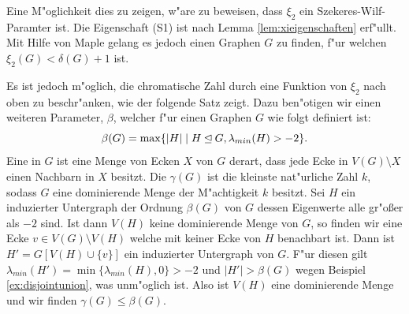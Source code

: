 Eine M"oglichkeit dies zu zeigen, w"are zu beweisen, dass $\xi_2$ ein Szekeres-Wilf-Paramter ist. Die Eigenschaft (S1) ist nach Lemma \ref{lem:xieigenschaften} erf"ullt. Mit Hilfe von Maple gelang es jedoch einen Graphen $G$ zu finden, f"ur welchen $\xi_{2}(G) < \delta(G) + 1$ ist. 

Es ist jedoch m"oglich, die chromatische Zahl durch eine Funktion von $\xi_2$ nach oben zu beschr"anken, wie der folgende Satz zeigt. Dazu ben"otigen wir einen weiteren Parameter, $\beta$, welcher f"ur einen Graphen $G$ wie folgt definiert ist:
$$\beta(G) = \max\{|H| \;|\; H\unlhd G, \lambda_{min}(H) > -2 \}.$$
Eine  in $G$ ist eine Menge von Ecken $X$ von $G$ derart, dass jede Ecke in $V(G)\setminus X$ einen Nachbarn in $X$ besitzt. 
Die  $\gamma(G)$ ist die kleinste nat"urliche Zahl $k$, sodass $G$ eine dominierende Menge der M"achtigkeit $k$ besitzt. 
Sei $H$ ein induzierter Untergraph der Ordnung $\beta(G)$ von $G$ dessen Eigenwerte alle gr"o{\ss}er als $-2$ sind. Ist dann $V(H)$ keine dominierende Menge von $G$, so finden wir eine Ecke $v\in V(G) \setminus V(H)$ welche mit keiner Ecke von $H$ benachbart ist.
Dann ist $H'=G[V(H)\cup \{v\}]$ ein induzierter Untergraph von $G$. F"ur diesen gilt $\lambda_{min}(H') = \min\{\lambda_{min}(H), 0\} > -2$ und $|H'| > \beta(G)$ wegen Beispiel \ref{ex:disjointunion}, was unm"oglich ist.
Also ist $V(H)$ eine dominierende Menge und wir finden $\gamma (G) \leq \beta(G)$. 

